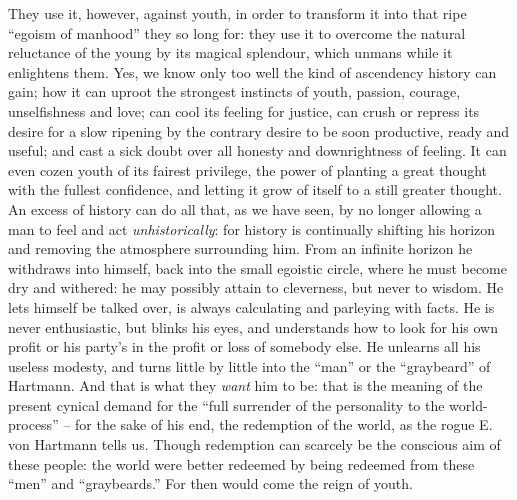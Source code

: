 They use it, however, against youth, in order to transform it into
that ripe \enquote{egoism of manhood} they so long for: they use it to
overcome the natural reluctance of the young by its magical
splendour, which unmans while it enlightens them. Yes, we know only
too well the kind of ascendency history can gain; how it can uproot
the strongest instincts of youth, passion, courage, unselfishness and
love; can cool its feeling for justice, can crush or repress its
desire for a slow ripening by the contrary desire to be soon
productive, ready and useful; and cast a sick doubt over all honesty
and downrightness of feeling. It can even cozen youth of its fairest
privilege, the power of planting a great thought with the fullest
confidence, and letting it grow of itself to a still greater thought.
An excess of history can do all that, as we have seen, by no longer
allowing a man to feel and act \textit{unhistorically}: for history is
continually shifting his horizon and removing the atmosphere
surrounding him. From an infinite horizon he withdraws into himself,
back into the small egoistic circle, where he must become dry and
withered: he may possibly attain to cleverness, but never to wisdom.
He lets himself be talked over, is always calculating and parleying
with facts. He is never enthusiastic, but blinks his eyes, and
understands how to look for his own profit or his party's in the
profit or loss of somebody else. He unlearns all his useless modesty,
and turns little by little into the \enquote{man} or the \enquote{graybeard} of
Hartmann. And that is what they \textit{want} him to be: that is the meaning
of the present cynical demand for the \enquote{full surrender of the
personality to the world-process} -- for the sake of his end, the
redemption of the world, as the rogue E. von Hartmann tells us.
Though redemption can scarcely be the conscious aim of these people:
the world were better redeemed by being redeemed from these \enquote{men} and
\enquote{graybeards.} For then would come the reign of youth.
